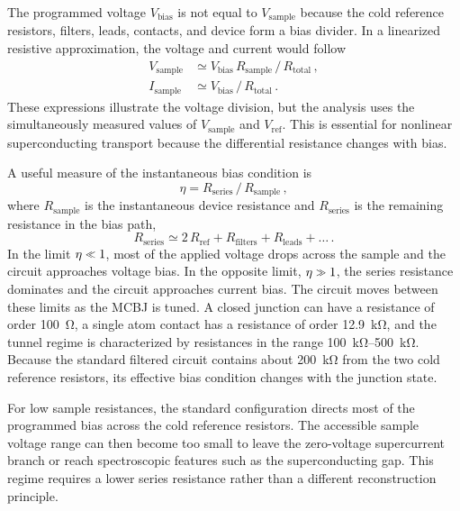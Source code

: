             The programmed voltage $V_\mathrm{bias}$ is not equal to $V_\mathrm{sample}$ because the cold reference resistors, filters, leads, contacts, and device form a bias divider. In a linearized resistive approximation, the voltage and current would follow
            \begin{align}
                V_\mathrm{sample} &\simeq V_\mathrm{bias}\,R_\mathrm{sample}\,/\,R_\mathrm{total}\,, \\
                I_\mathrm{sample} &\simeq V_\mathrm{bias}\,/\,R_\mathrm{total}\,.
                \label{eq:setup:bias-divider}
            \end{align}
            These expressions illustrate the voltage division, but the analysis uses the simultaneously measured values of $V_\mathrm{sample}$ and $V_\mathrm{ref}$. This is essential for nonlinear superconducting transport because the differential resistance changes with bias.

            A useful measure of the instantaneous bias condition is
            \begin{equation}
                \eta = R_\mathrm{series}\,/\, R_\mathrm{sample}\,,
                \label{eq:setup:bias-eta}
            \end{equation}
            where $R_\mathrm{sample}$ is the instantaneous device resistance and $R_\mathrm{series}$ is the remaining resistance in the bias path,
            \begin{equation}
                R_\mathrm{series}
                \simeq 2\,R_\mathrm{ref} + R_\mathrm{filters} + R_\mathrm{leads} + \ldots\,.
                \label{eq:setup:series-resistance}
            \end{equation}
            In the limit $\eta \sll 1$, most of the applied voltage drops across the sample and the circuit approaches voltage bias. In the opposite limit, $\eta \sgg 1$, the series resistance dominates and the circuit approaches current bias. The circuit moves between these limits as the MCBJ is tuned. A closed junction can have a resistance of order \qty{100}{\ohm}, a single atom contact has a resistance of order \qty{12.9}{\kilo\ohm}, and the tunnel regime is characterized by resistances in the range \qtyrange{100}{500}{\kilo\ohm}. Because the standard filtered circuit contains about \qty{200}{\kilo\ohm} from the two cold reference resistors, its effective bias condition changes with the junction state.

            For low sample resistances, the standard configuration directs most of the programmed bias across the cold reference resistors. The accessible sample voltage range can then become too small to leave the zero-voltage supercurrent branch or reach spectroscopic features such as the superconducting gap. This regime requires a lower series resistance rather than a different reconstruction principle.

